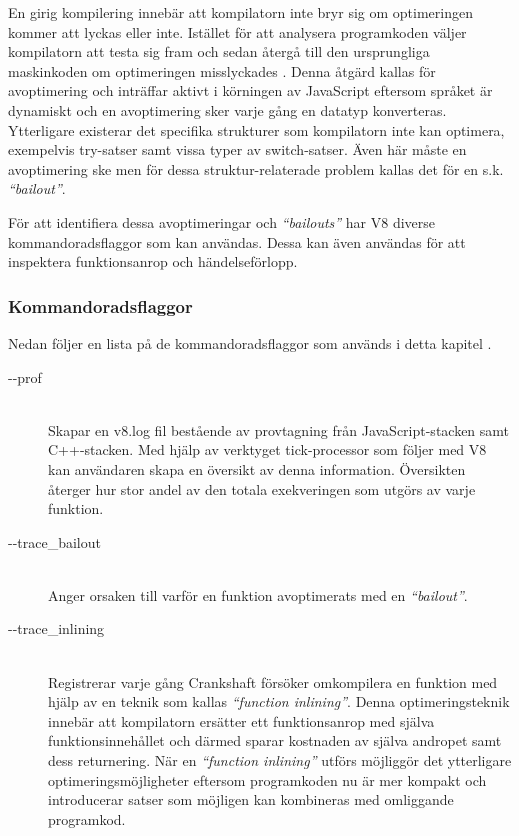En girig kompilering innebär att kompilatorn inte bryr sig om optimeringen
kommer att lyckas eller inte. Istället för att analysera programkoden väljer
kompilatorn att testa sig fram och sedan återgå till den ursprungliga
maskinkoden om optimeringen misslyckades \citep{mk10}. Denna åtgärd kallas
för avoptimering och inträffar aktivt i körningen av JavaScript eftersom
språket är dynamiskt och en avoptimering sker varje gång en datatyp
konverteras.  Ytterligare existerar det specifika strukturer som kompilatorn
inte kan optimera, exempelvis try-satser samt vissa typer av switch-satser.
Även här måste en avoptimering ske men för dessa struktur-relaterade problem
kallas det för en s.k. \textit{``bailout''}.

För att identifiera dessa avoptimeringar och \textit{``bailouts''} har V8 diverse
kommandoradsflaggor som kan användas. Dessa kan även användas för att
inspektera funktionsanrop och händelseförlopp.

\subsubsection{Kommandoradsflaggor}

Nedan följer en lista på de kommandoradsflaggor som används i detta kapitel
\citep{v8profiler}.

\begin{description}
  \item[-{}-prof] \hfill \\
    Skapar en v8.log fil bestående av provtagning från JavaScript-stacken
    samt C++-stacken. Med hjälp av verktyget tick-processor som följer med V8
    kan användaren skapa en översikt av denna information. Översikten återger
    hur stor andel av den totala exekveringen som utgörs av varje funktion.
  \item[-{}-trace_bailout] \hfill \\
    Anger orsaken till varför en funktion avoptimerats med en
    \textit{``bailout''}.
  \item[-{}-trace_inlining] \hfill \\
    Registrerar varje gång Crankshaft försöker omkompilera en funktion med
    hjälp av en teknik som kallas \textit{``function inlining''}. Denna
    optimeringsteknik innebär att kompilatorn ersätter ett funktionsanrop med
    själva funktionsinnehållet och därmed sparar kostnaden av själva andropet
    samt dess returnering. När en \textit{``function inlining''} utförs
    möjliggör det ytterligare optimeringsmöjligheter eftersom programkoden nu
    är mer kompakt och introducerar satser som möjligen kan kombineras med
    omliggande programkod.
\end{description}

